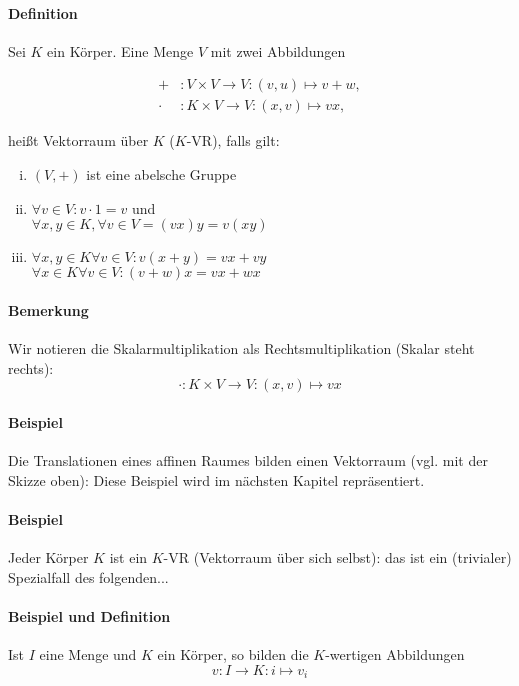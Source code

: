 \paragraph{Definition}
	Sei $K$ ein Körper. Eine Menge $V$ mit zwei Abbildungen

	\begin{align*}
		 +&: V \times V \to V:(v,u)\mapsto v+w,\\
		 \cdot &: K \times V \to V:(x,v)\mapsto vx,
	\end{align*}
	
	heißt Vektorraum über $K$ ($K$-VR), falls gilt:
	\begin{enumerate}[(i)]
		\item $(V,+)$ ist eine abelsche Gruppe
		\item $\forall v\in V: v\cdot 1=v$ und\\
			$\forall x,y \in K, \forall v\in V= (vx)y = v(xy)$
		\item $\forall x,y \in K \forall v\in V: v(x+y) = vx + vy$\\
			$\forall x\in K \forall v\in V: (v+w)x = vx + wx$
	\end{enumerate}

\paragraph{Bemerkung}
	Wir notieren die Skalarmultiplikation als Rechtsmultiplikation (Skalar steht rechts):
	\begin{equation*}
		\cdot: K \times V \to V : (x,v) \mapsto vx
	\end{equation*}

\paragraph{Beispiel}
	Die Translationen eines affinen Raumes bilden einen Vektorraum (vgl. mit der Skizze oben): Diese Beispiel wird im nächsten Kapitel repräsentiert.
	
\paragraph{Beispiel}
	Jeder Körper $ K $ ist ein $ K $-VR (Vektorraum über sich selbst): das ist ein (trivialer) Spezialfall des folgenden...
	
\paragraph{Beispiel und Definition}
	Ist $ I $ eine Menge und $ K $ ein Körper, so bilden die $ K $-wertigen Abbildungen
	\begin{equation*}
		v: I \to K: i \mapsto v_i
	\end{equation*}

